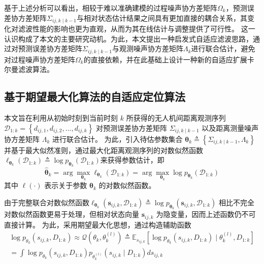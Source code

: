基于上述分析可以看出，相较于难以准确建模的过程噪声协方差矩阵$\Omega_{k}$​，预测误差协方差矩阵$\Sigma_{i j, k\mid k−1​}$​与相对状态估计结果之间具有更加直接的耦合关系，其变化对滤波性能的影响也更为直观，从而为其在线估计与调整提供了可行性。
这一认识构成了本文的主要研究动机。为此，本文提出一种启发式自适应滤波思路，通过对预测误差协方差矩阵$\Sigma_{i j, k\mid k−1​}$​与观测噪声协方差矩阵$\Lambda_{k}$​进行联合估计，避免对过程噪声协方差矩阵$\Omega_{k}$​的直接依赖，并在此基础上设计一种新的自适应扩展卡尔曼滤波算法。

\subsection{基于期望最大化算法的自适应定位算法}

本文旨在利用从初始时刻到当前时刻  $k$  所获得的无人机间距离观测序列$\mathcal{D}_{1: k}=\left\{d_{i j, 1}, d_{i j, 2}, \ldots, d_{i j, k}\right\}$
对预测误差协方差矩阵  $\Sigma_{i j, k \mid k-1}$  以及距离测量噪声协方差矩阵  $\Lambda_{k} $ 进行联合估计。
为此，引入待估参数集合
$\boldsymbol{\theta}_{k} \triangleq\left\{\Sigma_{i j, k \mid k-1}, \Lambda_{k}\right\}$
并基于最大似然准则，通过最大化距离观测序列的对数似然函数$\ell_{\boldsymbol{\theta}_{k}}\left(\mathcal{D}_{1: k}\right) \triangleq \log p_{\boldsymbol{\theta}_{k}}\left(\mathcal{D}_{1: k}\right)$来获得参数估计，即
\begin{equation}
\hat{\boldsymbol{\theta}}_{k}=\arg \max _{\boldsymbol{\theta}_{k}} \ell_{\boldsymbol{\theta}_{k}}\left(\mathcal{D}_{1: k}\right)=\arg \max _{\boldsymbol{\theta}_{k}} \log p_{\boldsymbol{\theta}_{k}}\left(\mathcal{D}_{1: k}\right) 
\end{equation}
其中  $\ell(\cdot)$  表示关于参数  $\boldsymbol{\theta}_{k}$  的对数似然函数。

由于完整联合对数似然函数$\ell_{\boldsymbol{\theta}_{k}}\left(\mathbf{s}_{i j, k}, \mathcal{D}_{1: k}\right) \triangleq \log p_{\boldsymbol{\theta}_{k}}\left(\mathbf{s}_{i j, k}, \mathcal{D}_{1: k}\right)$
相比不完全对数似然函数更易于处理，但相对状态向量  $\mathbf{s}_{i j, k}$  为隐变量，因而上述函数仍不可直接计算。
为此，采用期望最大化思想，通过构造辅助函数
\begin{equation}
\begin{array}{c}
\log p_{\theta_{k}}\left(s_{i j, k}, D_{1: k}\right) \approx \mathcal{Q}\left(\theta_{k}, \theta_{k}^{(l)}\right) \triangleq \mathbb{E}_{s_{i j, k}}\left[\log p_{\theta_{k}}\left(s_{i j, k}, D_{1: k}\right) \mid \theta_{k}^{(l)}, D_{1: k}\right] \\
=\int \log p_{\theta_{k}}\left(s_{i j, k}, D_{1: k}\right) p_{\theta_{k}^{(l)}}\left(s_{i j, k} \mid D_{1: k}\right) d s_{i j, k}
\label{equ:联合概率}
\end{array}
\end{equation}



